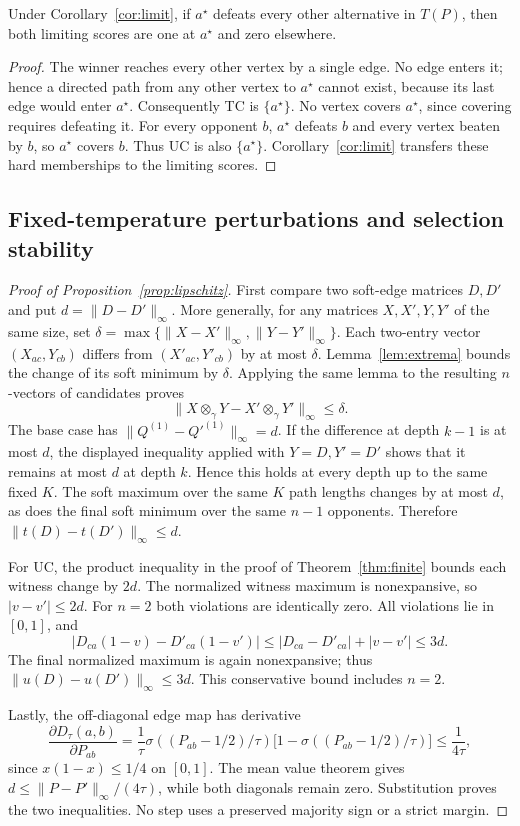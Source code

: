 \begin{corollary}\label{cor:condorcet}
Under Corollary~\ref{cor:limit}, if $a^\star$ defeats every other alternative in $T(P)$, then both limiting scores are one at $a^\star$ and zero elsewhere.
\end{corollary}
\begin{proof}
The winner reaches every other vertex by a single edge. No edge enters it; hence a directed path from any other vertex to $a^\star$ cannot exist, because its last edge would enter $a^\star$. Consequently TC is $\{a^\star\}$. No vertex covers $a^\star$, since covering requires defeating it. For every opponent $b$, $a^\star$ defeats $b$ and every vertex beaten by $b$, so $a^\star$ covers $b$. Thus UC is also $\{a^\star\}$. Corollary~\ref{cor:limit} transfers these hard memberships to the limiting scores.
\end{proof}

\subsection{Fixed-temperature perturbations and selection stability}\label{app:fixed-temperature}
\begin{proof}[Proof of Proposition~\ref{prop:lipschitz}]
First compare two soft-edge matrices $D,D'$ and put $d=\|D-D'\|_\infty$. More generally, for any matrices $X,X',Y,Y'$ of the same size, set $\delta=\max\{\|X-X'\|_\infty,\|Y-Y'\|_\infty\}$. Each two-entry vector $(X_{ac},Y_{cb})$ differs from $(X'_{ac},Y'_{cb})$ by at most $\delta$. Lemma~\ref{lem:extrema} bounds the change of its soft minimum by $\delta$. Applying the same lemma to the resulting $n$-vectors of candidates proves
\[
\|X\otimes_\gamma Y-X'\otimes_\gamma Y'\|_\infty\le\delta.
\]
The base case has $\|Q^{(1)}-Q'^{(1)}\|_\infty=d$. If the difference at depth $k-1$ is at most $d$, the displayed inequality applied with $Y=D,Y'=D'$ shows that it remains at most $d$ at depth $k$. Hence this holds at every depth up to the same fixed $K$. The soft maximum over the same $K$ path lengths changes by at most $d$, as does the final soft minimum over the same $n-1$ opponents. Therefore $\|t(D)-t(D')\|_\infty\le d$.

For UC, the product inequality in the proof of Theorem~\ref{thm:finite} bounds each witness change by $2d$. The normalized witness maximum is nonexpansive, so $|v-v'|\le2d$. For $n=2$ both violations are identically zero. All violations lie in $[0,1]$, and
\[
|D_{ca}(1-v)-D'_{ca}(1-v')|
\le |D_{ca}-D'_{ca}|+|v-v'|\le3d.
\]
The final normalized maximum is again nonexpansive; thus $\|u(D)-u(D')\|_\infty\le3d$. This conservative bound includes $n=2$.

Lastly, the off-diagonal edge map has derivative
\[
\frac{\partial D_\tau(a,b)}{\partial P_{ab}}
=\frac1\tau\sigma((P_{ab}-1/2)/\tau)
\bigl[1-\sigma((P_{ab}-1/2)/\tau)\bigr]\le\frac1{4\tau},
\]
since $x(1-x)\le1/4$ on $[0,1]$. The mean value theorem gives $d\le\|P-P'\|_\infty/(4\tau)$, while both diagonals remain zero. Substitution proves the two inequalities. No step uses a preserved majority sign or a strict margin.
\end{proof}

